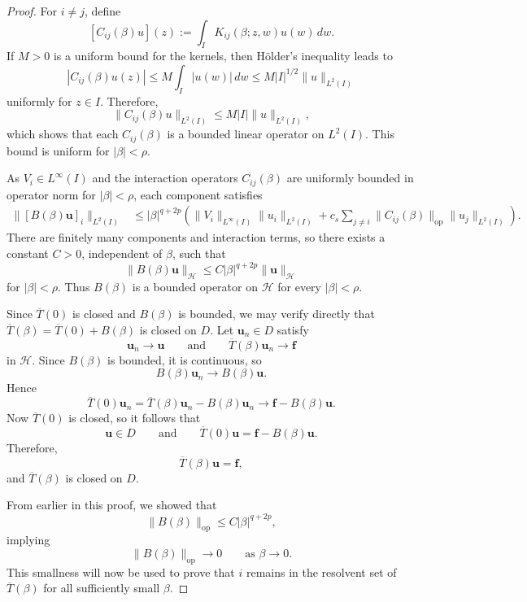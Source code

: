 \documentclass[preprint,12pt]{elsarticle}
\begin{document}
\begin{proof}
For $i\neq j$, define
\[
    [C_{ij}(\beta)u](z)
    :=
    \int_I K_{ij}(\beta;z,w)u(w)\,dw .
\]
If $M>0$ is a uniform bound for the kernels, then H\"older's inequality leads to
\[
    |C_{ij}(\beta)u(z)|
    \leq
    M\int_I |u(w)|\,dw
    \leq
    M|I|^{1/2}\|u\|_{L^2(I)}
\]
uniformly for $z\in I$. Therefore,
\[
    \|C_{ij}(\beta)u\|_{L^2(I)}
    \leq
    M|I|\|u\|_{L^2(I)},
\]
which shows that each $C_{ij}(\beta)$ is a bounded linear operator on $L^2(I)$. This bound is uniform for $|\beta|<\rho$.

As $V_i\in L^\infty(I)$ and the interaction operators
$C_{ij}(\beta)$ are uniformly bounded in operator norm for
$|\beta|<\rho$, each component satisfies
\[
\begin{aligned}
    \|[B(\beta)\mathbf u]_i\|_{L^2(I)}
    &\leq
    |\beta|^{q+2p}
    \left(
        \|V_i\|_{L^\infty(I)}\|u_i\|_{L^2(I)}
        +
        c_s\sum_{j\neq i}
        \|C_{ij}(\beta)\|_{\mathrm{op}}
        \|u_j\|_{L^2(I)}
    \right).
\end{aligned}
\]
There are finitely many components and interaction terms, so there
exists a constant $C>0$, independent of $\beta$, such that
\[
    \|B(\beta)\mathbf u\|_{\mathcal H}
    \leq
    C|\beta|^{q+2p}\|\mathbf u\|_{\mathcal H}
\]
for $|\beta|<\rho$. Thus $B(\beta)$ is a bounded operator on
$\mathcal H$ for every $|\beta|<\rho$.

Since $\overline T(0)$ is closed and $B(\beta)$ is bounded, we may
verify directly that $\overline T(\beta)=\overline T(0)+B(\beta)$ is
closed on $D$. Let $\mathbf u_n\in D$ satisfy
\[
    \mathbf u_n\to\mathbf u
    \qquad\text{and}\qquad
    \overline T(\beta)\mathbf u_n\to\mathbf f
\]
in $\mathcal H$. Since $B(\beta)$ is bounded, it is continuous, so
\[
    B(\beta)\mathbf u_n\to B(\beta)\mathbf u.
\]
Hence
\[
    \overline T(0)\mathbf u_n
    =
    \overline T(\beta)\mathbf u_n-B(\beta)\mathbf u_n
    \to
    \mathbf f-B(\beta)\mathbf u.
\]
Now $\overline T(0)$ is closed, so it follows that
\[
    \mathbf u\in D
    \qquad\text{and}\qquad
    \overline T(0)\mathbf u
    =
    \mathbf f-B(\beta)\mathbf u.
\]
Therefore,
\[
    \overline T(\beta)\mathbf u=\mathbf f,
\]
and $\overline T(\beta)$ is closed on $D$.

From earlier in this proof, we showed that
\[
    \|B(\beta)\|_{\mathrm{op}}
    \leq
    C|\beta|^{q+2p},
\]
implying 
\[
    \|B(\beta)\|_{\mathrm{op}}
    \longrightarrow 0
    \qquad\text{as }\beta\longrightarrow 0.
\]
This smallness will now be used to prove that $i$ remains in the
resolvent set of $\overline{T}(\beta)$ for all sufficiently small
$\beta$. 


\end{proof}
\end{document}
